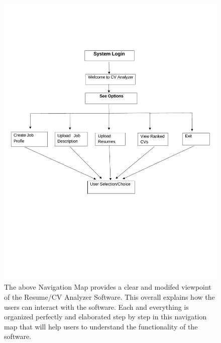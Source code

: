 \begin{figure}[H]
    \centering
    \includegraphics[width=1\linewidth,page=1]{img/diagrams/Updated_Navigation_Map_PDF.pdf}
    \vspace{-150pt}
    \caption{The above Navigation Map provides a clear and modifed viewpoint of the Resume/CV Analyzer Software. This overall explains how the users can interact with the software. Each and everything is organized perfectly and elaborated step by step in this navigation map that will help users to understand the functionality of the software.
}
\end{figure}

